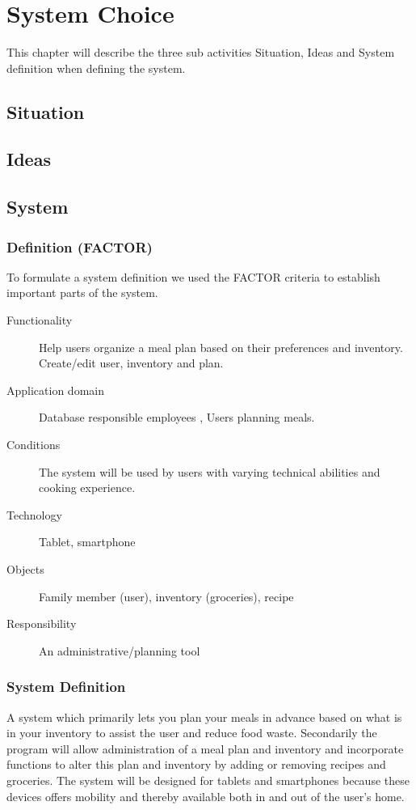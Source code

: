  \chapter{System Choice}
This chapter will describe the three sub activities Situation, Ideas and System definition when defining the system. 
\section{Situation}

\section{Ideas}

\section{System}
\subsection{Definition (FACTOR)}
To formulate a system definition we used the FACTOR \cite{OOAD_BATOF} criteria to establish important parts of the system.

\begin{description}
	\item[Functionality] Help users organize a meal plan based on their preferences and inventory. Create/edit user, inventory and plan.
	\item[Application domain] Database responsible employees , Users planning meals.
	\item[Conditions] The system will be used by users with varying technical abilities and cooking experience.
	\item[Technology] Tablet, smartphone
	\item[Objects] Family member (user), inventory (groceries), recipe
	\item[Responsibility] An administrative/planning tool
\end{description}

\subsection{System Definition}
A system which primarily lets you plan your meals in advance based on what is in your inventory to assist the user and reduce food waste. Secondarily the program will allow administration of a meal plan and inventory and incorporate functions to alter this plan and inventory by adding or removing recipes and groceries. The system will be designed for tablets and smartphones because these devices offers mobility and thereby available both in and out of the user’s home.
